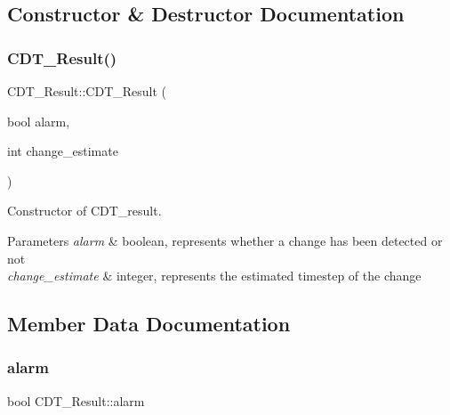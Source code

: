 \subsection{Constructor \& Destructor Documentation}
\mbox{\label{class_c_d_t___result_a55f9f8ce1a3f02a77502e34788abefb8}} 
\subsubsection{\texorpdfstring{C\+D\+T\+\_\+\+Result()}{CDT\_Result()}}
{\footnotesize\ttfamily C\+D\+T\+\_\+\+Result\+::\+C\+D\+T\+\_\+\+Result (\begin{DoxyParamCaption}\item[{bool}]{alarm,  }\item[{int}]{change\+\_\+estimate }\end{DoxyParamCaption})}



Constructor of C\+D\+T\+\_\+result. 


\begin{DoxyParams}{Parameters}
{\em alarm} & boolean, represents whether a change has been detected or not \\
\hline
{\em change\+\_\+estimate} & integer, represents the estimated timestep of the change \\
\hline
\end{DoxyParams}


\subsection{Member Data Documentation}
\mbox{\label{class_c_d_t___result_a4e9efc182d7b730a00f5b14d8e9a94d7}} 
\subsubsection{\texorpdfstring{alarm}{alarm}}
{\footnotesize\ttfamily bool C\+D\+T\+\_\+\+Result\+::alarm}

\mbox{\label{class_c_d_t___result_a69cea3ae579857edc859347aa47f41b6}} 
